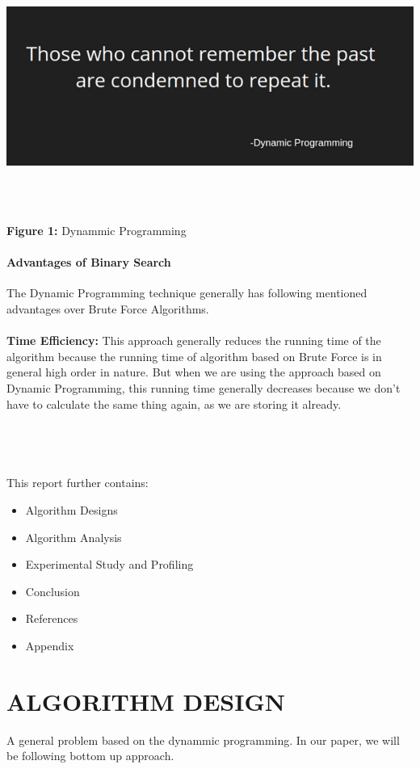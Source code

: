 \documentclass[10pt]{article}
\begin{document}
\begin{multicols*}{2}
\includegraphics[width=\columnwidth, height=8cm]{DP.png}\begin{center}\textbf{Figure 1:} Dynammic Programming\end{center}


\paragraph{Advantages of Binary Search}
The Dynamic Programming technique generally has following mentioned advantages over Brute Force Algorithms.\\\\
\textbf{Time Efficiency: } This approach generally reduces the running time of the algorithm because the running time of algorithm based on Brute Force is in general high order in nature. But when we are using the approach based on Dynamic Programming, this running time generally decreases because we don't have to calculate the same thing again, as we are storing it already. \\
\\\\\\\\This report further contains:
\begin{itemize}
\item 	Algorithm  Designs
\item 	Algorithm  Analysis
\item 	Experimental Study and Profiling
\item 	Conclusion
\item 	References
\item 	Appendix
\end{itemize}

\section*{ALGORITHM DESIGN}
A general problem based on the dynammic programming. In our paper, we will be following bottom up approach.


\end{multicols*}
\end{document}
